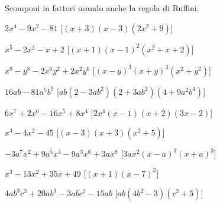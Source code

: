

\begin{esercizio}[\Ast]
 \label{ese:17.24}
 Scomponi in fattori usando anche la regola di Ruffini.
 \begin{enumeratea}
  \item \(2x^{4}-9x^{2}-81\)
  \hfill [\((x+3)(x-3)(2x^{2}+9)\)]
\item \(x^{5}-2x^{2}-x+2\)
  \hfill [\((x+1)(x-1)^{2}(x^{2}+x+2)\)]
\item \(x^{8}-y^{8}-2x^{6}y^{2}+2x^{2}y^{6}\)
  \hfill [\((x-y)^{3}(x+y)^{3}(x^{2}+y^{2})\)]
\item \(16ab-81a^{5}b^{9}\)
  \hfill [\({ab}(2-3{ab}^{2})(2+3{ab}^{2})(4+9a^{2}b^{4})\)]
\item \(6x^{7}+2x^{6}-16x^{5}+8x^{4}\)
  \hfill [\(2x^{4}(x-1)(x+2)(3x-2)\)]
\item \(x^{4}-4x^{2}-45\)
  \hfill [\((x-3)(x+3)(x^{2}+5)\)]
\item \(-3a^{7}x^{2}+9a^{5}x^{4}-9a^{3}x^{6}+3ax^{8}\)
  \hfill [\(3ax^{2}(x-a)^{3}(x+a)^{3}\)]
\item \(x^{3}-13x^{2}+35x+49\)
  \hfill [\((x+1)(x-7)^{2}\)]
\item \(4ab^{3}c^{2}+20ab^{3}-3abc^{2}-15ab\)
  \hfill [\({ab}(4b^{2}-3)(c^{2}+5)\)]
 \end{enumeratea}
\end{esercizio}


